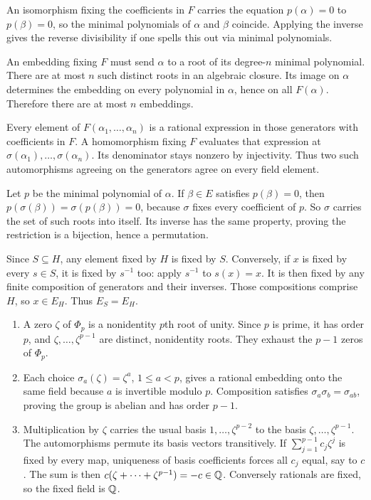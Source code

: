 An isomorphism fixing the coefficients in $F$ carries the equation $p(\alpha)=0$ to $p(\beta)=0$, so the minimal polynomials of $\alpha$ and $\beta$ coincide. Applying the inverse gives the reverse divisibility if one spells this out via minimal polynomials.

An embedding fixing $F$ must send $\alpha$ to a root of its degree-$n$ minimal polynomial. There are at most $n$ such distinct roots in an algebraic closure. Its image on $\alpha$ determines the embedding on every polynomial in $\alpha$, hence on all $F(\alpha)$. Therefore there are at most $n$ embeddings.

Every element of $F(\alpha_1,\ldots,\alpha_n)$ is a rational expression in those generators with coefficients in $F$. A homomorphism fixing $F$ evaluates that expression at $\sigma(\alpha_1),\ldots,\sigma(\alpha_n)$. Its denominator stays nonzero by injectivity. Thus two such automorphisms agreeing on the generators agree on every field element.

Let $p$ be the minimal polynomial of $\alpha$. If $\beta\in E$ satisfies $p(\beta)=0$, then $p(\sigma(\beta))=\sigma(p(\beta))=0$, because $\sigma$ fixes every coefficient of $p$. So $\sigma$ carries the set of such roots into itself. Its inverse has the same property, proving the restriction is a bijection, hence a permutation.

Since $S\subseteq H$, any element fixed by $H$ is fixed by $S$. Conversely, if $x$ is fixed by every $s\in S$, it is fixed by $s^{-1}$ too: apply $s^{-1}$ to $s(x)=x$. It is then fixed by any finite composition of generators and their inverses. Those compositions comprise $H$, so $x\in E_H$. Thus $E_S=E_H$.

\begin{enumerate}[label=(\alph*)]
\item A zero $\zeta$ of $\Phi_p$ is a nonidentity $p$th root of unity. Since $p$ is prime, it has order $p$, and $\zeta,\ldots,\zeta^{p-1}$ are distinct, nonidentity roots. They exhaust the $p-1$ zeros of $\Phi_p$.
\item Each choice $\sigma_a(\zeta)=\zeta^a$, $1\le a<p$, gives a rational embedding onto the same field because $a$ is invertible modulo $p$. Composition satisfies $\sigma_a\sigma_b=\sigma_{ab}$, proving the group is abelian and has order $p-1$.
\item Multiplication by $\zeta$ carries the usual basis $1,\ldots,\zeta^{p-2}$ to the basis $\zeta,\ldots,\zeta^{p-1}$. The automorphisms permute its basis vectors transitively. If $\sum_{j=1}^{p-1}c_j\zeta^j$ is fixed by every map, uniqueness of basis coefficients forces all $c_j$ equal, say to $c$. The sum is then $c(\zeta+\cdots+\zeta^{p-1})=-c\in\mathbb{Q}$. Conversely rationals are fixed, so the fixed field is $\mathbb{Q}$.
\end{enumerate}

